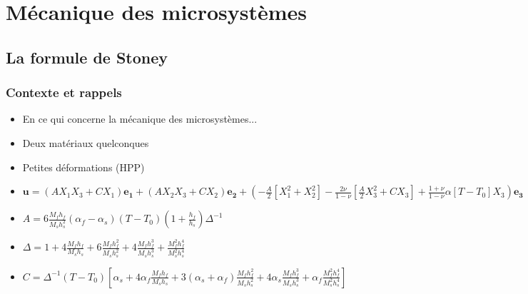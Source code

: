 \section{Mécanique des microsystèmes} %


\subsection{La formule de Stoney} %

\begin{frame}
    \frametitle{Contexte et rappels}
    \begin{itemize}
        \item En ce qui concerne la mécanique des microsystèmes...
        \item Deux matériaux quelconques
        \item Petites déformations (HPP)
        \item $\bm{u} = (AX_1X_3 + CX_1)\bm{e_1} + (AX_2X_3 + CX_2)\bm{e_2} + (-\frac{A}{2}\left[X_1^2+X_2^2\right]-\frac{2\nu}{1-\nu}\left[\frac{A}{2}X_3^2+CX_3\right]+\frac{1+\nu}{1-\nu}\alpha\left[T-T_0\right]X_3)\bm{e_3}$
        \item $A = 6\frac{M_fh_f}{M_sh_s^2}(\alpha_f-\alpha_s)(T-T_0)(1+\frac{h_f}{h_s})\Delta^{-1}$
        \item $\Delta = 1+4\frac{M_fh_f}{M_sh_s}+6\frac{M_fh_f^2}{M_sh_s^2}+4\frac{M_fh_f^3}{M_sh_s^3}+\frac{M_f^2h_f^4}{M_s^2h_s^4}$
        \item $C = \Delta^{-1}(T-T_0)\left[\alpha_s + 4 \alpha_f \frac{M_fh_f}{M_sh_s} + 3 (\alpha_s + \alpha_f)\frac{M_fh_f^2}{M_sh_s^2} + 4\alpha_s \frac{M_fh_f^3}{M_sh_s^3} + \alpha_f \frac{M_f^2h_f^4}{M_s^2h_s^4}  \right]$
    \end{itemize}
\end{frame}

    
